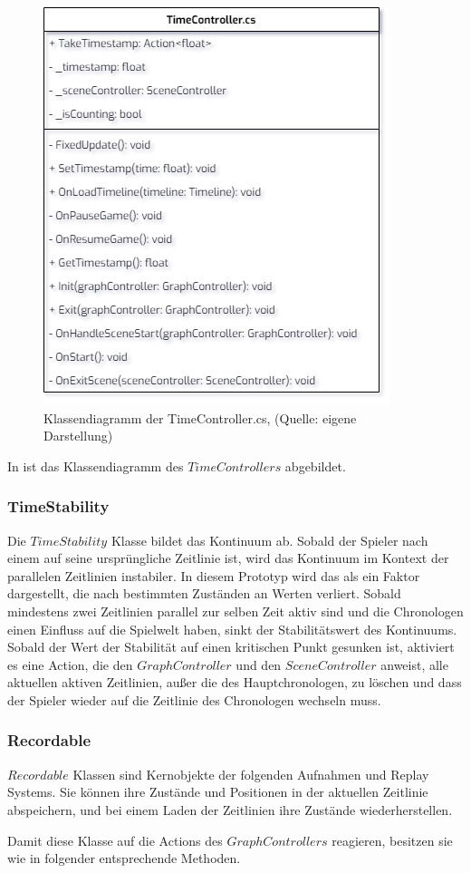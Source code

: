 \begin{figure}[ht]
\centering
\includegraphics[width=0.4\linewidth]{content/pictures/TimeController.jpg}
\caption{Klassendiagramm der TimeController.cs, (Quelle: eigene Darstellung)}
\label{fig:timeController-cs}
\end{figure}

In  ist das Klassendiagramm des $TimeControllers$ abgebildet.

\subsubsection{TimeStability}
Die $TimeStability$ Klasse bildet das Kontinuum ab. Sobald der Spieler nach einem  auf seine ursprüngliche Zeitlinie  ist, wird das Kontinuum im Kontext der parallelen Zeitlinien instabiler. In diesem Prototyp wird das als ein Faktor dargestellt, die nach bestimmten Zuständen an Werten verliert. Sobald mindestens zwei Zeitlinien parallel zur selben Zeit aktiv sind und die Chronologen einen Einfluss auf die Spielwelt haben, sinkt der Stabilitätswert des Kontinuums. Sobald der Wert der Stabilität auf einen kritischen Punkt gesunken ist, aktiviert es eine Action, die den $GraphController$ und den $SceneController$ anweist, alle aktuellen aktiven Zeitlinien, außer die des Hauptchronologen, zu löschen und dass der Spieler wieder auf die Zeitlinie des Chronologen wechseln muss.
\subsubsection{Recordable}
$Recordable$ Klassen sind Kernobjekte der folgenden Aufnahmen und Replay Systems. Sie können ihre Zustände und Positionen in der aktuellen Zeitlinie abspeichern, und bei einem Laden der Zeitlinien ihre Zustände wiederherstellen.

Damit diese Klasse auf die Actions des $GraphControllers$ reagieren, besitzen sie wie in folgender  entsprechende Methoden.


